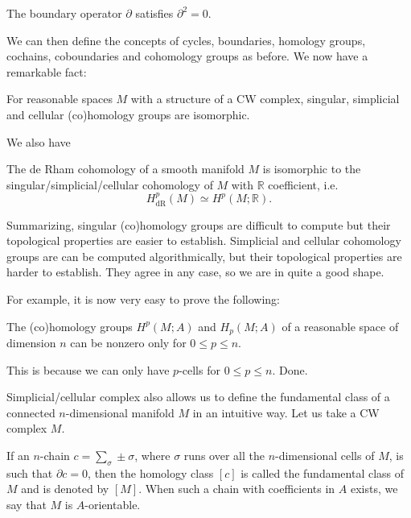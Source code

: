 \documentclass[12pt]{article}
\numberwithin{equation}{section}
\theoremstyle{remark}
\def\bR{\mathbb{R}}
\begin{document}
\begin{proposition}
The boundary operator $\partial$ satisfies $\partial^2=0$.
\end{proposition}

We can then define the concepts of cycles, boundaries, homology groups, cochains, coboundaries and cohomology groups as before.
We now have a remarkable fact:

\begin{theorem}
  For reasonable spaces $M$ with a structure of a CW complex,
  singular, simplicial and cellular (co)homology groups are isomorphic.
\end{theorem}

We also have

\begin{theorem}
The de Rham cohomology of a smooth manifold $M$
is isomorphic to the singular/simplicial/cellular 
cohomology of $M$ with $\bR$ coefficient, i.e. \begin{equation}
H^p_\text{dR}(M)\simeq H^p(M;\bR).
\end{equation}
\end{theorem}

Summarizing,
singular (co)homology groups are difficult to compute but their topological properties are easier to establish.
Simplicial and cellular cohomology groups are can be computed algorithmically,
 but their topological properties are harder to establish.
They agree in any case, so we are in quite a good shape.

For example, it is now very easy to prove the following:
\begin{corollary}
  The (co)homology groups $H^p(M;A)$ and $H_p(M;A)$ of a reasonable space of dimension $n$ can be nonzero
  only for $0\le p\le n$.
\end{corollary}
This is because we can only have $p$-cells for $0\le p\le n$. Done.


Simplicial/cellular complex also allows us to define the fundamental class of 
a connected $n$-dimensional manifold $M$ in an intuitive way.
Let us take a CW complex $M$.
\begin{definition}
If an $n$-chain $c=\sum_{\sigma} \pm \sigma$,
where $\sigma$ runs over all the $n$-dimensional cells of $M$, is such that $\partial c=0$,
then the homology class $[c]$ is called the fundamental class of $M$
and is denoted by $[M]$.
When such a chain with coefficients in $A$ exists, 
we say that $M$ is $A$-orientable.
\end{definition}
\end{document}
